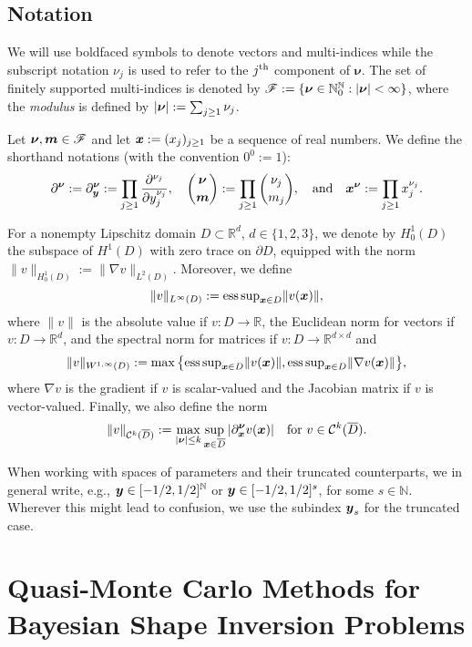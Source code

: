 \documentclass[graybox]{svmult}
\begin{document}
\subsection{Notation}\label{sec:notations}

We will use boldfaced symbols to denote vectors and multi-indices while the subscript notation $\nu_j$ is used to refer to the $j^{\rm th}$ component of $\boldsymbol \nu$. The set of finitely supported multi-indices is denoted by
$\mathscr F:=\{\boldsymbol\nu\in\mathbb N_0^{\mathbb N}:|{\boldsymbol{\nu}}|<\infty\}$, where the {\em modulus} is defined by $|{\boldsymbol{\nu}}|:=\sum_{j\geq 1}\nu_j$.

Let ${\boldsymbol{\nu}},\boldsymbol m\in\mathscr F$ and let ${\boldsymbol{x}}:=(x_j)_{j\geq 1}$ be a sequence of real numbers. We define the shorthand notations (with the convention $0^0:=1$):
\begin{align*}
\partial^{{\boldsymbol{\nu}}}:=\partial_{{\boldsymbol{y}}}^{{\boldsymbol{\nu}}}:=\prod_{j\geq 1}\frac{\partial^{\nu_j}}{\partial y_j^{\nu_j}},\quad \binom{{\boldsymbol{\nu}}}{\boldsymbol m}:=\prod_{j\geq 1}\binom{\nu_j}{m_j},\quad \text{and}\quad {\boldsymbol{x}}^{\boldsymbol \nu}:=\prod_{j\geq 1}x_j^{\nu_j}.
\end{align*}

For   a nonempty Lipschitz domain $D\subset\mathbb R^d$, $d\in\{1,2,3\}$, we denote by $H_0^1(D)$ the subspace of $H^1(D)$ with zero trace on $\partial D$, equipped with the norm $\|v\|_{H_0^1(D)}:=\|\nabla v\|_{L^2(D)}$. Moreover, we define 
$$
\|v\|_{L^\infty(D)}:={\rm ess\,sup}_{{\boldsymbol{x}}\in D}\|v({\boldsymbol{x}})\|,
$$
where $\|v\|$ is the absolute value if $v: D \to \mathbb{R}$, the Euclidean norm for vectors if $v: D \to \mathbb{R}^d$, and the spectral norm for matrices if $v: D \to \mathbb{R}^{d\times d}$ and
$$
\|v\|_{W^{1,\infty}(D)}:= \max\big\{{\rm ess\,sup}_{{\boldsymbol{x}}\in D}\|v({\boldsymbol{x}})\|,{\rm ess\,sup}_{{\boldsymbol{x}}\in D}\|\nabla v({\boldsymbol{x}})\|\big\},
$$
where $\nabla v$ is the gradient if $v$ is scalar-valued and the Jacobian matrix if $v$ is vector-valued. Finally, we also define the norm
$$
\|v\|_{\mathcal C^k(\overline{D})}:=\max_{|{\boldsymbol{\nu}}|\leq k}\sup_{{\boldsymbol{x}}\in \overline{D}}|\partial_{{\boldsymbol{x}}}^{{\boldsymbol{\nu}}}v({\boldsymbol{x}})|\quad\text{for}~v\in \mathcal C^k(\overline{D}).
$$

When working with spaces of parameters and their truncated counterparts, we in general write, e.g., ${\boldsymbol{y}} \in [-1/2, 1/2]^{\mathbb{N}}$ or ${\boldsymbol{y}} \in [-1/2, 1/2]^{s}$, for some $s \in \mathbb{N}$. Wherever this might lead to confusion, we use the subindex ${\boldsymbol{y}}_s$ for the truncated case. 

\section{Quasi-Monte Carlo Methods for Bayesian Shape Inversion Problems}
\label{sec: QMC for Bayesian inversion}
\end{document}
